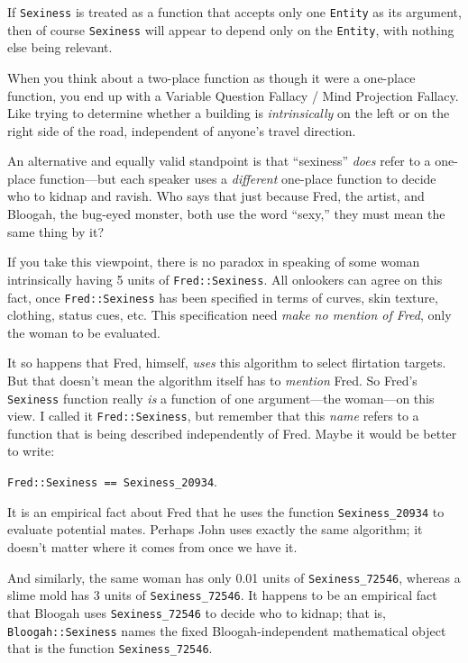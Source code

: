 {
 If \texttt{Sexiness} is treated as a function that accepts only one \texttt{Entity}
as its argument, then of course \texttt{Sexiness} will appear to depend only on
the \texttt{Entity}, with nothing else being relevant.}

{
 When you think about a two-place function as though it were a
one-place function, you end up with a Variable Question Fallacy / Mind
Projection Fallacy. Like trying to determine whether a building is
\textit{intrinsically} on the left or on the right side of the road,
independent of anyone's travel direction.}

{
 An alternative and equally valid standpoint is that
``sexiness'' \textit{does} refer to
a one-place function---but each speaker uses a \textit{different}
one-place function to decide who to kidnap and ravish. Who says that
just because Fred, the artist, and Bloogah, the bug-eyed monster, both
use the word ``sexy,'' they must
mean the same thing by it?}

{
 If you take this viewpoint, there is no paradox in speaking of
some woman intrinsically having 5 units of \texttt{Fred::Sexiness}. All
onlookers can agree on this fact, once \texttt{Fred::Sexiness} has been
specified in terms of curves, skin texture, clothing, status cues, etc.
This specification need \textit{make no mention of Fred}, only the
woman to be evaluated.}

{
 It so happens that Fred, himself, \textit{uses} this algorithm to
select flirtation targets. But that doesn't mean the
algorithm itself has to \textit{mention} Fred. So
Fred's \texttt{Sexiness} function really \textit{is} a function
of one argument---the woman---on this view. I called it \texttt{Fred::Sexiness},
but remember that this \textit{name} refers to a function that is being
described independently of Fred. Maybe it would be better to write:}

\begin{center}
\texttt{Fred::Sexiness == Sexiness\_20934}.
\end{center}

{
 It is an empirical fact about Fred that he uses the function
\texttt{Sexiness\_20934} to evaluate potential mates. Perhaps John uses exactly
the same algorithm; it doesn't matter where it comes
from once we have it.}

{
 And similarly, the same woman has only 0.01 units of
\texttt{Sexiness\_72546}, whereas a slime mold has 3 units of \texttt{Sexiness\_72546}.
It happens to be an empirical fact that Bloogah uses \texttt{Sexiness\_72546} to
decide who to kidnap; that is, \texttt{Bloogah::Sexiness} names the fixed
Bloogah-independent mathematical object that is the function
\texttt{Sexiness\_72546}.}

